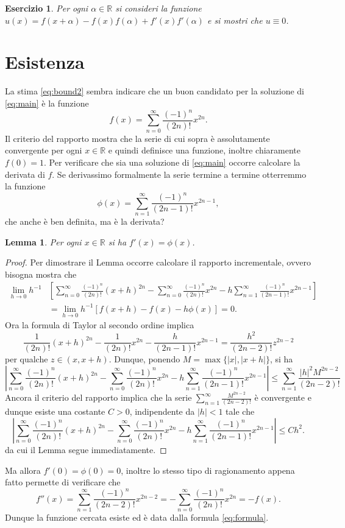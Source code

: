 \documentclass{amsart}
\numberwithin{equation}{section}
\newtheorem{lem}[thm]{Lemma}
\newtheorem{es}[thm]{Esercizio}
\newcommand\bR{{\mathbb R}}
\begin{document}
\begin{es} Per ogni $\alpha\in\bR$ si consideri la funzione $u(x)=f(x+\alpha)-f(x)f(\alpha)+f'(x)f'(\alpha)$ e si mostri che $u\equiv 0$.
\end{es}

\section{Esistenza}
La stima \eqref{eq:bound2} sembra indicare che un buon candidato per la soluzione di \eqref{eq:main} \`e la funzione
\begin{equation}\label{eq:formula}
f(x)=\sum_{n=0}^\infty\frac{(-1)^n}{(2n)!}x^{2n}.
\end{equation}
Il criterio del rapporto mostra che la serie di cui sopra \`e assolutamente convergente per ogni $x\in \bR$ e quindi definisce una funzione, inoltre chiaramente $f(0)=1$. Per verificare che sia una soluzione di \eqref{eq:main} occorre calcolare la derivata di $f$. Se derivassimo formalmente la serie termine a termine otterremmo la funzione
\begin{equation}\label{eq:formula_der}
\phi(x)=\sum_{n=1}^\infty\frac{(-1)^n}{(2n-1)!}x^{2n-1},
\end{equation}
che anche \`e ben definita, ma \`e la derivata?

\begin{lem}\label{lem:der}
Per ogni $x\in \bR$ si ha $f'(x)=\phi(x)$.
\end{lem}
\begin{proof}
Per dimostrare il Lemma occorre calcolare il rapporto incrementale, ovvero bisogna mostra che
\[
\begin{split}
\lim_{h\to 0} h^{-1}&\left[\sum_{n=0}^\infty\frac{(-1)^n}{(2n)!}(x+h)^{2n}-\sum_{n=0}^\infty\frac{(-1)^n}{(2n)!}x^{2n}-h\sum_{n=1}^\infty\frac{(-1)^n}{(2n-1)!}x^{2n-1}\right]\\
&=\lim_{h\to 0} h^{-1}\left[f(x+h)-f(x)-h\phi(x)\right]=0.
\end{split}
\]
Ora la formula di Taylor al secondo ordine implica
\[
\frac{1}{(2n)!}(x+h)^{2n}-\frac{1}{(2n)!}x^{2n}-\frac{h}{(2n-1)!}x^{2n-1}=\frac{h^2}{(2n-2)!}z^{2n-2}
\]
per qualche $z\in (x,x+h)$. Dunque, ponendo $M=\max\{|x|,|x+h|\}$, si ha
\[
\left|\sum_{n=0}^\infty\frac{(-1)^n}{(2n)!}(x+h)^{2n}-\sum_{n=0}^\infty\frac{(-1)^n}{(2n)!}x^{2n}-h\sum_{n=1}^\infty\frac{(-1)^n}{(2n-1)!}x^{2n-1}\right|\leq \sum_{n=1}^\infty\frac{|h|^2M^{2n-2}}{(2n-2)!}
\]
Ancora il criterio del rapporto implica che la serie $\sum_{n=1}^\infty\frac{M^{2n-2}}{(2n-2)!}$ \`e convergente e dunque esiste una costante $C>0$, indipendente da $|h|<1$ tale che 
\[
\left|\sum_{n=0}^\infty\frac{(-1)^n}{(2n)!}(x+h)^{2n}-\sum_{n=0}^\infty\frac{(-1)^n}{(2n)!}x^{2n}-h\sum_{n=1}^\infty\frac{(-1)^n}{(2n-1)!}x^{2n-1}\right|\leq C h^2.
\]
da cui il Lemma segue immediatamente. 
\end{proof}
Ma allora $f'(0)=\phi(0)=0$, inoltre lo stesso tipo di ragionamento appena fatto permette di verificare che
\[
f''(x)=\sum_{n=1}^\infty\frac{(-1)^n}{(2n-2)!}x^{2n-2}=-\sum_{n=0}^\infty\frac{(-1)^n}{(2n)!}x^{2n}
=-f(x).
\]
Dunque la funzione cercata esiste ed \`e data dalla formula \eqref{eq:formula}.
\end{document}
